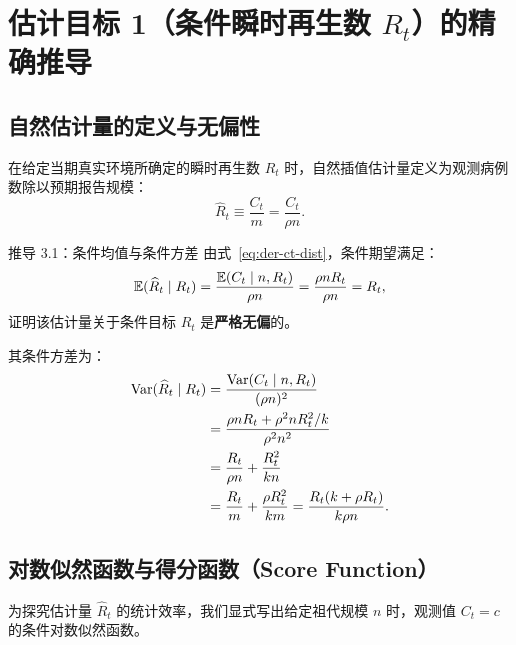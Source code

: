 \section{估计目标 1（条件瞬时再生数 $R_t$）的精确推导}
\label{sec:part03}

\subsection{自然估计量的定义与无偏性}

在给定当期真实环境所确定的瞬时再生数 $R_t$ 时，自然插值估计量定义为观测病例数除以预期报告规模：
\begin{equation}
  \widehat{R}_t \equiv \frac{C_t}{m} = \frac{C_t}{\rho n}.
  \label{eq:estimator-def}
\end{equation}

\begin{derivationbox}{推导 3.1：条件均值与条件方差}
由式~\eqref{eq:der-ct-dist}，条件期望满足：
\begin{equation}
  \mathbb{E}(\widehat{R}_t \mid R_t) = \frac{\mathbb{E}(C_t \mid n, R_t)}{\rho n} = \frac{\rho n R_t}{\rho n} = R_t,
\end{equation}
证明该估计量关于条件目标 $R_t$ 是\textbf{严格无偏}的。

其条件方差为：
\begin{align}
  \mathrm{Var}(\widehat{R}_t \mid R_t) &= \frac{\mathrm{Var}(C_t \mid n, R_t)}{(\rho n)^2} \nonumber \\
  &= \frac{\rho n R_t + \rho^2 n R_t^2 / k}{\rho^2 n^2} \nonumber \\
  &= \frac{R_t}{\rho n} + \frac{R_t^2}{kn} \nonumber \\
  &= \frac{R_t}{m} + \frac{\rho R_t^2}{km} = \frac{R_t (k + \rho R_t)}{k \rho n}.
  \label{eq:var-target1-exact}
\end{align}
\end{derivationbox}

\subsection{对数似然函数与得分函数（Score Function）}

为探究估计量 $\widehat{R}_t$ 的统计效率，我们显式写出给定祖代规模 $n$ 时，观测值 $C_t = c$ 的条件对数似然函数。

